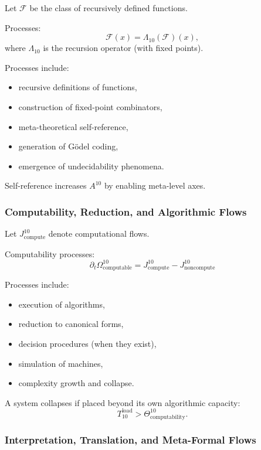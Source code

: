 Let $\mathcal{F}$ be the class of recursively defined functions.

Processes:
\[
\mathcal{F}(x) = \Lambda_{10}(\mathcal{F})(x),
\]
where $\Lambda_{10}$ is the recursion operator (with fixed points).

Processes include:
\begin{itemize}
    \item recursive definitions of functions,
    \item construction of fixed-point combinators,
    \item meta-theoretical self-reference,
    \item generation of Gödel coding,
    \item emergence of undecidability phenomena.
\end{itemize}

Self-reference increases $A^{10}$ by enabling meta-level axes.

\subsubsection{Computability, Reduction, and Algorithmic Flows}

Let $J^{10}_{\text{compute}}$ denote computational flows.

Computability processes:
\[
\partial_t \Omega^{10}_{\text{computable}}
= J^{10}_{\text{compute}} - J^{10}_{\text{noncompute}}
\]

Processes include:
\begin{itemize}
    \item execution of algorithms,
    \item reduction to canonical forms,
    \item decision procedures (when they exist),
    \item simulation of machines,
    \item complexity growth and collapse.
\end{itemize}

A system collapses if placed beyond its own algorithmic capacity:
\[
T_{10}^{\text{load}} > \Theta^{10}_{\text{computability}}.
\]

\subsubsection{Interpretation, Translation, and Meta-Formal Flows}

